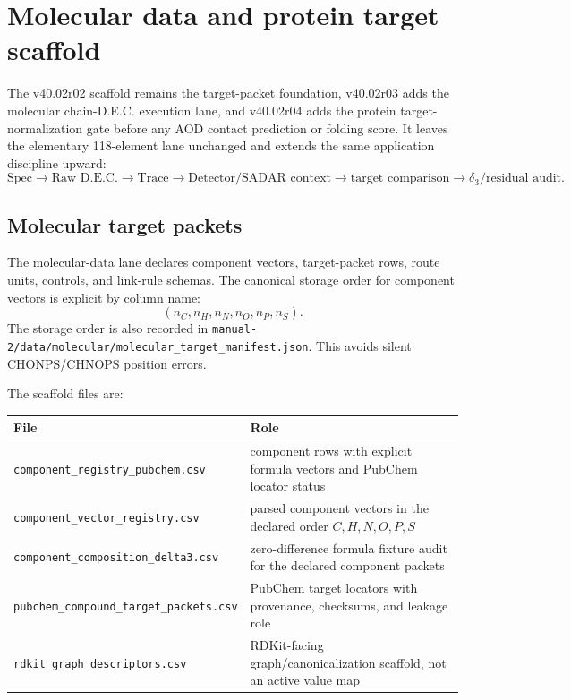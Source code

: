 \section{Molecular data and protein target scaffold}

The v40.02r02 scaffold remains the target-packet foundation, v40.02r03 adds the molecular chain-D.E.C. execution lane, and v40.02r04 adds the protein target-normalization gate before any AOD contact prediction or folding score. It leaves the elementary 118-element lane unchanged and extends the same application discipline upward:
\[
\text{Spec}\to\text{Raw D.E.C.}\to\text{Trace}\to\text{Detector/SADAR context}\to\text{target comparison}\to\delta_3\text{/residual audit}.
\]

\subsection{Molecular target packets}

The molecular-data lane declares component vectors, target-packet rows, route units, controls, and link-rule schemas. The canonical storage order for component vectors is explicit by column name:
\[
(n_C,n_H,n_N,n_O,n_P,n_S).
\]
The storage order is also recorded in \texttt{manual-2/data/molecular/molecular\_target\_manifest.json}. This avoids silent CHONPS/CHNOPS position errors.

The scaffold files are:
\begin{center}
\begin{tabularx}{\linewidth}{@{}lX@{}}
\toprule
File & Role \\
\midrule
\texttt{component\_registry\_pubchem.csv} & component rows with explicit formula vectors and PubChem locator status \\
\texttt{component\_vector\_registry.csv} & parsed component vectors in the declared order $C,H,N,O,P,S$ \\
\texttt{component\_composition\_delta3.csv} & zero-difference formula fixture audit for the declared component packets \\
\texttt{pubchem\_compound\_target\_packets.csv} & PubChem target locators with provenance, checksums, and leakage role \\
\texttt{rdkit\_graph\_descriptors.csv} & RDKit-facing graph/canonicalization scaffold, not an active value map \\
\bottomrule
\end{tabularx}
\end{center}

